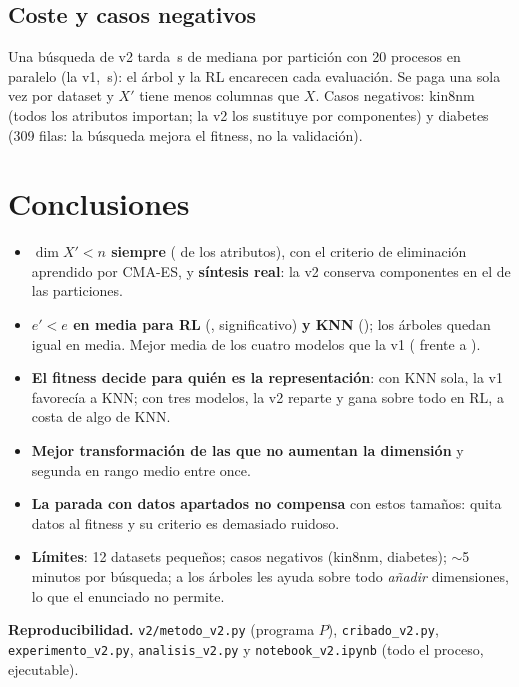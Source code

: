 \documentclass[memoria,twocolumn]{uc3mmaster}
\begin{document}
\subsection{Coste y casos negativos}
Una búsqueda de v2 tarda \dosSegMediana\,s de mediana por partición con 20 procesos en paralelo (la v1, \segMediana\,s):
el árbol y la RL encarecen cada evaluación. Se paga una sola vez por dataset y $X'$ tiene menos columnas que $X$.
Casos negativos: kin8nm (todos los atributos importan; la v2 los sustituye por componentes) y diabetes (309 filas: la
búsqueda mejora el fitness, no la validación).

\section{Conclusiones}
\begin{itemize}
\item \textbf{$\dim X'<n$ siempre} (\dosDimMedia{} de los atributos), con el criterio de eliminación aprendido por
CMA-ES, y \textbf{síntesis real}: la v2 conserva componentes en el \dosFracConComp{} de las particiones.
\item \textbf{$e'<e$ en media para RL} (\dosCambioRL, significativo) \textbf{y KNN} (\dosCambioKNN); los árboles quedan
igual en media. Mejor media de los cuatro modelos que la v1 (\dosCambioMedio{} frente a \dosCambioMedioUno).
\item \textbf{El fitness decide para quién es la representación}: con KNN sola, la v1 favorecía a KNN; con tres
modelos, la v2 reparte y gana sobre todo en RL, a costa de algo de KNN.
\item \textbf{Mejor transformación de las que no aumentan la dimensión} y segunda en rango medio entre once.
\item \textbf{La parada con datos apartados no compensa} con estos tamaños: quita datos al fitness y su criterio es
demasiado ruidoso.
\item \textbf{Límites}: 12 datasets pequeños; casos negativos (kin8nm, diabetes); $\sim$5 minutos por búsqueda; a los
árboles les ayuda sobre todo \emph{añadir} dimensiones, lo que el enunciado no permite.
\end{itemize}

{\footnotesize\textbf{Reproducibilidad.} \texttt{v2/metodo\_v2.py} (programa $P$), \texttt{cribado\_v2.py},
\texttt{experimento\_v2.py}, \texttt{analisis\_v2.py} y \texttt{notebook\_v2.ipynb} (todo el proceso, ejecutable).\par}
\end{document}

